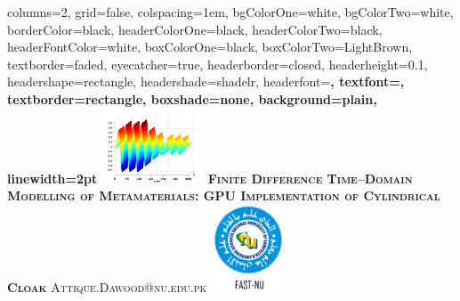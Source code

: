 \documentclass[portrait,final,a1paper,fontscale=0.4]{baposter}
\begin{document}


\begin{poster}%
  {
  columns=2,
  grid=false,
  colspacing=1em,
  bgColorOne=white,
  bgColorTwo=white,
  borderColor=black,
  headerColorOne=black,
  headerColorTwo=black,
  headerFontColor=white,
  boxColorOne=black,
  boxColorTwo=LightBrown,
  textborder=faded,
  eyecatcher=true,
  headerborder=closed,
  headerheight=0.1\textheight,
  headershape=rectangle,
  headershade=shadelr,
  headerfont=\Large\bf\textsc, %
  textfont={\setlength{\parindent}{1.5em}},
  textborder=rectangle,
  boxshade=none,
  background=plain,
  linewidth=2pt
  }
  { 
  \includegraphics[height=6.0em]{Figures/FigCh03_2DDNGSteadyStateLossy}
  } 
  {\bf\textsc{Finite Difference Time--Domain Modelling of Metamaterials: GPU Implementation of Cylindrical Cloak}\vspace{0.4em}}
  {\textsc{Attique.Dawood@nu.edu.pk}\vspace{-0.8em}}
  {%
  \includegraphics[height=7.0em]{Figures/NU_Logo_Text}
  }


\end{poster}
\end{document}
